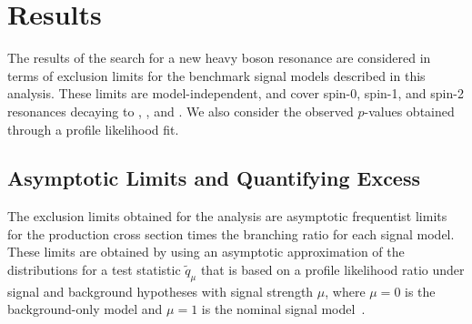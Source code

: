 
\section{Results}
\label{sec:results}

The results of the search for a new heavy boson resonance are considered in terms of exclusion limits for the benchmark signal models described in this analysis.
These limits are model-independent, and cover spin-0, spin-1, and spin-2 resonances decaying to \WW, \WZ, and \WH.
We also consider the observed $p$-values obtained through a profile likelihood fit.

\subsection{Asymptotic Limits and Quantifying Excess}

The exclusion limits obtained for the analysis are asymptotic frequentist limits for the production cross section times the branching ratio for each signal model.
These limits are obtained by using an asymptotic approximation of the distributions for a test statistic $\tilde{q}_\mu$ that is based on a profile likelihood ratio under signal and background hypotheses with signal strength $\mu$, where $\mu=0$ is the background-only model and $\mu=1$ is the nominal signal model~\cite{Cowan_2011,CMS-NOTE-2011-005}.


